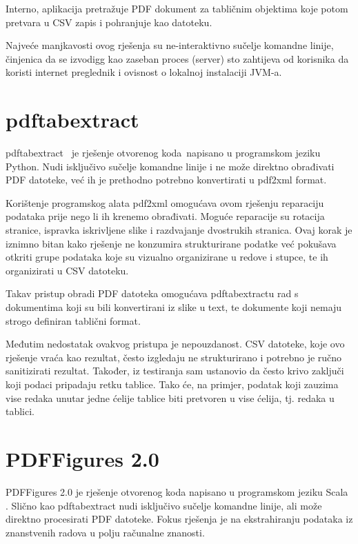 \documentclass[times, utf8, zavrsni]{fer}
\begin{document}
Interno, aplikacija pretražuje PDF dokument za tabličnim objektima koje potom
pretvara u CSV zapis i pohranjuje kao datoteku.

Najveće manjkavosti ovog rješenja su ne-interaktivno sučelje komandne linije,
činjenica da se izvodigg kao zaseban proces (server) sto zahtijeva od korisnika
da koristi internet preglednik i ovisnost o lokalnoj instalaciji JVM-a.

\section{pdftabextract}

pdftabextract \cite{pdftabextract_repository} je rješenje otvorenog koda napisano
u programskom jeziku Python.
Nudi isključivo sučelje komandne linije i ne može direktno obrađivati PDF
datoteke, već ih je prethodno potrebno konvertirati u pdf2xml format.

Korištenje programskog alata pdf2xml omogućava ovom rješenju reparaciju
podataka prije nego li ih krenemo obrađivati. Moguće reparacije su rotacija
stranice, ispravka iskrivljene slike i razdvajanje dvostrukih stranica. Ovaj
korak je iznimno bitan kako rješenje ne konzumira strukturirane podatke već
pokušava otkriti grupe podataka koje su vizualno organizirane u redove i
stupce, te ih organizirati u CSV datoteku.

Takav pristup obradi PDF datoteka omogućava pdftabextractu rad s dokumentima
koji su bili konvertirani iz slike u text, te dokumente koji nemaju strogo
definiran tablični format.

Međutim nedostatak ovakvog pristupa je nepouzdanost.
CSV datoteke, koje ovo rješenje vraća kao rezultat, često izgledaju ne
strukturirano i potrebno je ručno sanitizirati rezultat. Također, iz testiranja
sam ustanovio da često krivo zaključi koji podaci pripadaju retku tablice.
Tako će, na primjer, podatak koji zauzima vise redaka unutar jedne ćelije
tablice biti pretvoren u vise ćelija, tj. redaka u tablici.

\section{PDFFigures 2.0}

PDFFigures 2.0 \cite{pdffigures_2_repository} je rješenje otvorenog koda
napisano u programskom jeziku Scala \cite{scala_documentation}. Slično kao
pdftabextract nudi isključivo
sučelje komandne linije, ali može direktno procesirati PDF datoteke. Fokus
rješenja je na ekstrahiranju podataka iz znanstvenih radova u polju računalne
znanosti.
\end{document}
